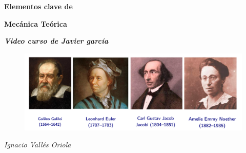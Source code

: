 \begin{center}

\Huge{\textbf{Elementos clave de}}

\Huge{\textbf{Mecánica Teórica}} 


\large{\textbf{\textit{Video curso de Javier garcía}}}

\vspace{10mm}
\begin{figure}[H]
	\centering
	\includegraphics[width=.75\textwidth]{imagenes/portada2.png}
\end{figure}

\vspace{2cm}
\begin{flushright}
	\normalsize{\emph{Ignacio Vallés Oriola}}
\end{flushright}


\end{center}





